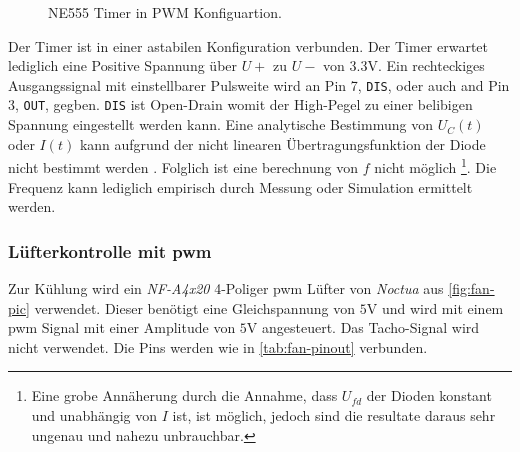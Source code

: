 \begin{figure}
    \caption{NE555 Timer in PWM Konfiguartion.}
    \label{fig:ne555-pwm}
\end{figure}

Der Timer ist in einer astabilen Konfiguration verbunden.
Der Timer erwartet lediglich eine Positive Spannung über $U+$ zu $U-$ von $3.3\si{\volt}$.
Ein rechteckiges Ausgangssignal mit einstellbarer Pulsweite wird an Pin 7, \texttt{DIS}, oder auch and Pin 3, \texttt{OUT}, gegben.
\texttt{DIS} ist Open-Drain womit der High-Pegel zu einer belibigen Spannung eingestellt werden kann.
Eine analytische Bestimmung von $U_C(t)$ oder $I(t)$ kann aufgrund der nicht linearen Übertragungsfunktion der Diode nicht bestimmt werden \autocite{rdc}.
Folglich ist eine berechnung von $f$ nicht möglich
\footnote{Eine grobe Annäherung durch die Annahme, dass $U_{fd}$ der Dioden konstant und unabhängig von $I$ ist, ist möglich, jedoch sind die resultate daraus sehr ungenau und nahezu unbrauchbar.}.
Die Frequenz kann lediglich empirisch durch Messung oder Simulation ermittelt werden.

\subsubsection{Lüfterkontrolle mit \acrshort{pwm}}

Zur Kühlung wird ein \textit{NF-A4x20} 4-Poliger \gls{pwm} Lüfter von \textit{Noctua} aus \autoref{fig:fan-pic} verwendet.
Dieser benötigt eine Gleichspannung von $5\si{\volt}$ und wird mit einem \gls{pwm} Signal mit einer Amplitude von $5\si{\volt}$ angesteuert.
Das Tacho-Signal wird nicht verwendet.
Die Pins werden wie in \autoref{tab:fan-pinout} verbunden.

